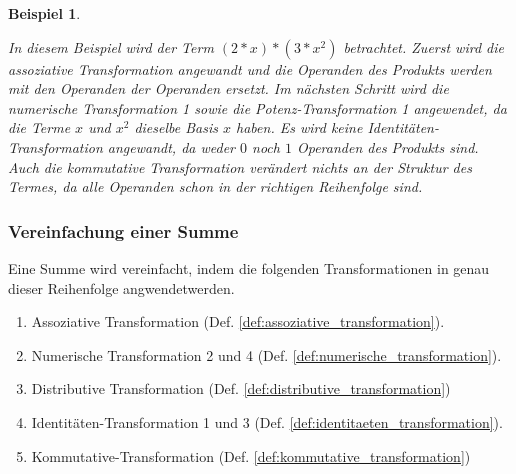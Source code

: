 \documentclass[11pt]{article}
\newcommand{\lab}[1]{(Def. \ref{#1})}
\newtheorem{example}{Beispiel}
\begin{document}
\begin{example}
\begin{figure}
  \end{figure}
  \newline
  In diesem Beispiel wird der Term $(2*x)*(3*x^2)$ betrachtet. Zuerst wird die assoziative Transformation angewandt und
  die Operanden des Produkts werden mit den Operanden der Operanden ersetzt. Im nächsten Schritt wird die numerische 
  Transformation 1 sowie die Potenz-Transformation 1 angewendet, da die Terme $x$ und $x^2$ dieselbe Basis $x$ haben.
  Es wird keine Identitäten-Transformation angewandt, da weder $0$ noch $1$ Operanden des Produkts sind.
  Auch die kommutative Transformation verändert nichts an der Struktur des Termes, da alle Operanden schon in der richtigen
  Reihenfolge sind.
\end{example}

\subsubsection{Vereinfachung einer Summe}
Eine Summe wird vereinfacht, indem die folgenden 
Transformationen in genau dieser Reihenfolge angwendetwerden.
\begin{enumerate}
  \item Assoziative Transformation \lab{def:assoziative_transformation}.
  \item Numerische Transformation 2 und 4 \lab{def:numerische_transformation}.
  \item Distributive Transformation \lab{def:distributive_transformation}
  \item Identitäten-Transformation 1 und 3 \lab{def:identitaeten_transformation}.
  \item Kommutative-Transformation \lab{def:kommutative_transformation}
\end{enumerate}
\end{document}
